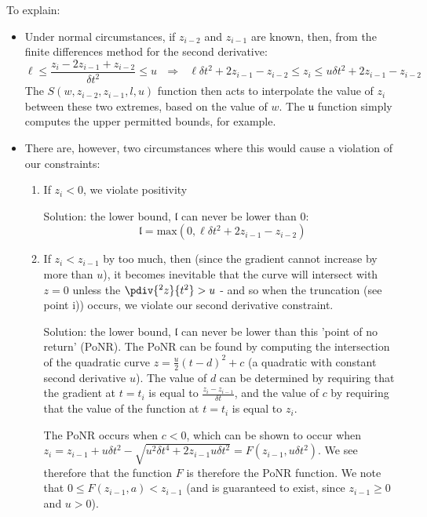 \documentclass[]{article}
\begin{document}
				To explain:
				\begin{itemize}
					\item Under normal circumstances, if $z_{i-2}$ and $z_{i-1}$ are known, then, from the finite differences method for the second derivative:
					\begin{equation}
						\ell \leq \frac{z_i - 2 z_{i-1} + z_{i-2}}{\delta t^2} \leq u ~~~\Longrightarrow~~~\ell \delta t^2 + 2z_{i-1} - z_{i-2} \leq z_i \leq u\delta t^2 + 2z_{i-1} - z_{i-2} 
					\end{equation}
					The $S(w,z_{i-2},z_{i-1},l,u)$ function then acts to interpolate the value of $z_i$ between these two extremes, based on the value of $w$. The $\mathfrak{u}$ function simply computes the upper permitted bounds, for example.
					\item There are, however, two circumstances where this would cause a violation of our constraints:
					\begin{enumerate}
						\item If $z_i < 0$, we violate positivity
						
						Solution: the lower bound, $\mathfrak{l}$ can never be lower than 0:
						\begin{equation}
							\mathfrak{l} = \text{max}(0,\ell \delta t^2 + 2z_{i-1} - z_{i-2} )
						\end{equation}
						\item If $z_i < z_{i-1}$ by too much, then (since the gradient cannot increase by more than $u$), it becomes inevitable that the curve will intersect with $z = 0$ unless the $\pdiv{^2 z}{t^2} > u$ - and so when the truncation (see point i)) occurs, we violate our second derivative constraint.
						
						Solution: the lower bound, $\mathfrak{l}$ can never be lower than this 'point of no return' (PoNR). The PoNR can be found by computing the intersection of the quadratic curve $z = \frac{u}{2}(t - d)^2 + c$ (a quadratic with constant second derivative $u$). The value of $d$ can be determined by requiring that the gradient at $t = t_i$ is equal to $\frac{z_i - z_{i-1}}{\delta t}$, and the value of $c$ by requiring that the value of the function at $t = t_i$ is equal to $z_i$.

						The PoNR occurs when $c < 0$, which can be shown to occur when $z_i = z_{i-1} + u \delta t^2 - \sqrt{u^2 \delta t^4 + 2 z_{i-1} u \delta t^2} = F(z_{i-1},u \delta t^2)$. We see therefore that the function $F$ is therefore the PoNR function. We note that $0 \leq F(z_{i-1},a) < z_{i-1}$ (and is guaranteed to exist, since $z_{i-1} \geq 0$ and $u > 0$).


\end{enumerate}
\end{itemize}
\end{document}
